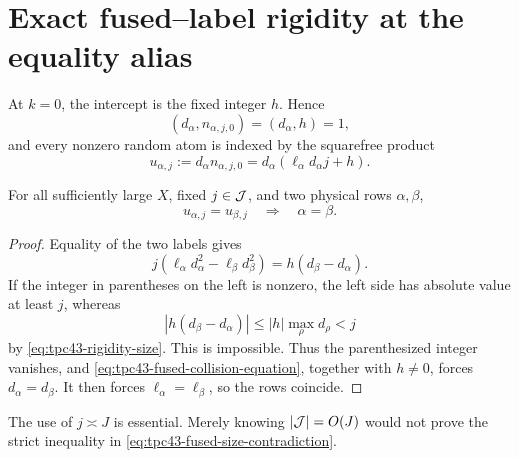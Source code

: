 \section{Exact fused--label rigidity at the equality alias}
\label{sec:tpc43-zero-rigidity}

At \(k=0\), the intercept is the fixed integer \(h\).  Hence
\begin{equation}
 (d_\alpha,n_{\alpha,j,0})
 =(d_\alpha,h)=1,
 \label{eq:tpc43-zero-coprimality}
\end{equation}
and every nonzero random atom is indexed by the squarefree product
\begin{equation}
 u_{\alpha,j}
 :=d_\alpha n_{\alpha,j,0}
 =d_\alpha(\ell_\alpha d_\alpha j+h).
 \label{eq:tpc43-fused-zero-label}
\end{equation}

\begin{lemma}
\label{lem:tpc43-fused-label-injectivity}
For all sufficiently large \(X\), fixed \(j\in\mathcal J\), and two physical
rows \(\alpha,\beta\),
\begin{equation}
 u_{\alpha,j}=u_{\beta,j}
 \quad\Longrightarrow\quad
 \alpha=\beta.
 \label{eq:tpc43-fused-label-injective}
\end{equation}
\end{lemma}

\begin{proof}
Equality of the two labels gives
\begin{equation}
 j(\ell_\alpha d_\alpha^2-\ell_\beta d_\beta^2)
 =h(d_\beta-d_\alpha).
 \label{eq:tpc43-fused-collision-equation}
\end{equation}
If the integer in parentheses on the left is nonzero, the left side has
absolute value at least \(j\), whereas
\begin{equation}
 |h(d_\beta-d_\alpha)|
 \le |h|\max_\rho d_\rho<j
 \label{eq:tpc43-fused-size-contradiction}
\end{equation}
by \eqref{eq:tpc43-rigidity-size}.  This is impossible.  Thus the
parenthesized integer vanishes, and
\eqref{eq:tpc43-fused-collision-equation}, together with \(h\ne0\),
forces \(d_\alpha=d_\beta\).  It then forces
\(\ell_\alpha=\ell_\beta\), so the rows coincide.
\end{proof}

The use of \(j\asymp J\) is essential.  Merely knowing
\(|\mathcal J|=O(J)\) would not prove the strict inequality in
\eqref{eq:tpc43-fused-size-contradiction}.

